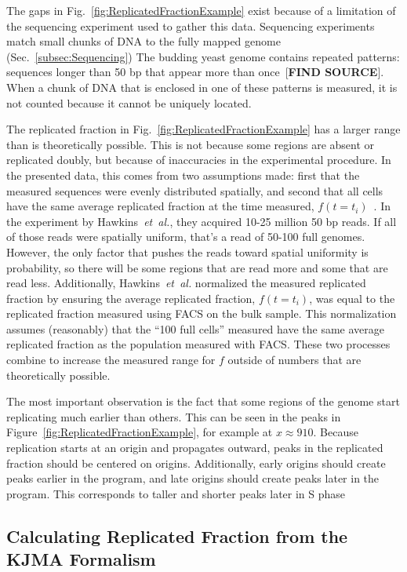 		The gaps in Fig.~\ref{fig:ReplicatedFractionExample} exist because of a limitation of the sequencing experiment used to gather this data.
		Sequencing experiments match small chunks of DNA to the fully mapped genome (Sec.~\ref{subsec:Sequencing})
		The budding yeast genome contains repeated patterns: sequences longer than 50 bp that appear more than once~[\textbf{FIND SOURCE}].
		When a chunk of DNA that is enclosed in one of these patterns is measured, it is not counted because it cannot be uniquely located.
		
		The replicated fraction in Fig.~\ref{fig:ReplicatedFractionExample} has a larger range than is theoretically possible.
		This is not because some regions are absent or replicated doubly, but because of inaccuracies in the experimental procedure.
		In the presented data, this comes from two assumptions made: first that the measured sequences were evenly distributed spatially, and second that all cells have the same average replicated fraction at the time measured, $f(t=t_i)$~\cite{StochasticTermination}.
		In the experiment by Hawkins~\emph{et~al.}, they acquired 10-25 million 50 bp reads.
		If all of those reads were spatially uniform, that's a read of 50-100 full genomes.
		However, the only factor that pushes the reads toward spatial uniformity is probability, so there will be some regions that are read more and some that are read less.
		Additionally, Hawkins~\emph{et~al.} normalized the measured replicated fraction by ensuring the average replicated fraction, $f(t=t_i)$, was equal to the replicated fraction measured using FACS on the bulk sample.
		This normalization assumes (reasonably) that the ``100 full cells'' measured have the same average replicated fraction as the population measured with FACS.
		These two processes combine to increase the measured range for $f$ outside of numbers that are theoretically possible.
		
		The most important observation is the fact that some regions of the genome start replicating much earlier than others.
		This can be seen in the peaks in Figure~\ref{fig:ReplicatedFractionExample}, for example at $x \approx 910$.
		Because replication starts at an origin and propagates outward, peaks in the replicated fraction should be centered on origins.
		Additionally, early origins should create peaks earlier in the program, and late origins should create peaks later in the program.
		This corresponds to taller and shorter peaks later in S phase
		
		
		\subsection{Calculating Replicated Fraction from the KJMA Formalism}
		\label{subsec:KJMA}
		
